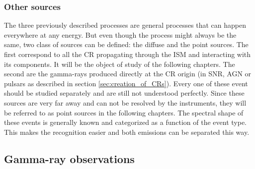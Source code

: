 
\subsubsection{Other sources}

The three previously described processes are general processes that can happen everywhere at any energy. But even though the process might always be the same, two class of sources can be defined: the diffuse and the point sources. 
The first correspond to all the CR propagating through the ISM and interacting with its components. It will be the object of study of the following chapters. 
The second are the gamma-rays produced directly at the CR origin (in SNR, AGN or pulsars as described in section \ref{sec:creation_of_CRs}). Every one of these event should be studied separately and are still not understood perfectly. Since these sources are very far away and can not be resolved by the instruments, they will be referred to as point sources in the following chapters. The spectral shape of these events is generally known and categorized as a function of the event type. This makes the recognition easier and both emissions can be separated 
this way.




\subsection{Gamma-ray observations}

